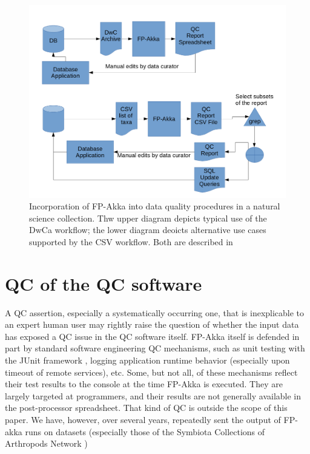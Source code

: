 \documentclass{article}
\begin{document}
\begin{figure}[h]
\includegraphics[width=\textwidth]{FP-Akka-externaldataflowpaths.png}
\caption{Incorporation of FP-Akka into data quality procedures in a natural science collection.  Thw upper diagram depicts typical use of the DwCa workflow; the lower diagram deoicts alternative use cases supported by the CSV workflow. Both are described in \citep{Kurator_wiki_2016}}
\label{fig:largerprocesses}
\end{figure}


\section{QC of the QC software}
A QC assertion, especially a systematically occurring one, that is inexplicable to an expert human user may rightly raise the question of whether the input data has exposed a QC issue in the QC software itself. FP-Akka itself is defended in part by standard software engineering QC mechanisms, such as unit testing
\citep{Fraser:2003:DPT:949344.949407} with the JUnit framework \citep{junit-web-2010}, logging application runtime behavior (especially upon timeout of remote services), etc. Some, but not all, of these mechanisms reflect their test results to the console at the time FP-Akka is executed. They are largely targeted at programmers, and their results are not generally available in the post-processor spreadsheet. That kind of QC is outside the scope of this paper.  We have, however, over several years, repeatedly sent the output of FP-akka runs on datasets (especially those of the Symbiota Collections of Arthropods Network \citep{SCAN_TCN_website_2016})
\end{document}
